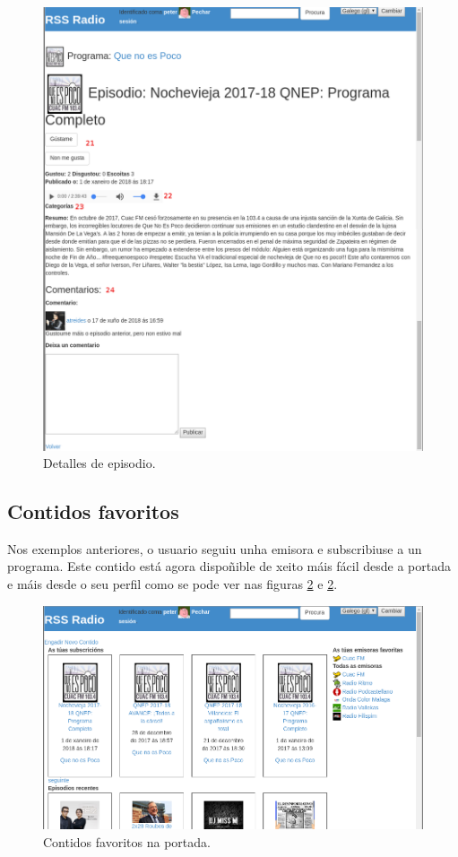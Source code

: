 \begin{figure}[h]
	\centering
	\includegraphics[scale=0.45,keepaspectratio=true]{./images/usermanual/um-episoded1.png}
	\caption{Detalles de episodio.}
	\label{fig:um-episoded1}
\end{figure}

\subsection{Contidos favoritos}

Nos exemplos anteriores, o usuario seguiu unha emisora e subscribiuse a un programa. Este contido está agora dispoñible de xeito máis fácil desde a portada e máis desde o seu perfil como se pode ver nas figuras \ref{fig:um-index-auth} e \ref{fig:um-index-auth}.

\begin{figure}[h]
	\centering
	\includegraphics[scale=0.45,keepaspectratio=true]{./images/usermanual/um-index-auth.png}
	\caption{Contidos favoritos na portada.}
	\label{fig:um-index-auth}
\end{figure}


